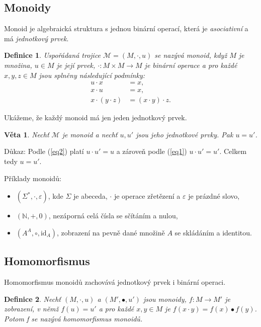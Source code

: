 \documentclass[a4paper,11pt,twocolumn]{article}
\newtheorem{definice}{Definice}
\newtheorem{veta}{Věta}
\begin{document}
\subsection{Monoidy}
Monoid je algebraická struktura s jednou binární operací, která je \textit{asociativní} a má \textit{jednotkový prvek}.

\begin{definice}\label{def1}
\textit{Us\-pořádaná trojice $\mathcal{M} = (M, \cdot, u)$ se nazývá \emph{monoid}, když $M$ je množina, $u \in M$ je její prvek, $\cdot : M \times M \to M$ je binární operace a pro každé $x, y, z \in M$ jsou splněny následující podmínky:
\begin{align}
u \cdot x &= x, \label{eq1} \\
x \cdot u &= x, \label{eq2} \\
x \cdot (y \cdot z) &= (x \cdot y) \cdot z. \label{eq3}
\end{align}} 
\end{definice}

\noindent Ukážeme, že každý monoid má jen jeden jednotkový prvek.

\begin{veta}\label{veta1}
\textit{Nechť $\mathcal{M}$ je monoid a nechť $u, u'$ jsou jeho jednotkové prvky. Pak $u = u'$.}
\end{veta}

Důkaz: Podle (\ref{eq2}) platí $u \cdot u' = u$ a zároveň podle (\ref{eq1}) $u \cdot u' = u'$. Celkem tedy $u = u'$.

Příklady monoidů: 
\begin{itemize}
  \item $(\Sigma^\ast, \cdot, \varepsilon)$, kde $\Sigma$ je abeceda, $\cdot$ je operace zřetězení a $\varepsilon$ je prázdné slovo,
  \item $(\mathbb{N}, +, 0)$, nezáporná celá čísla se sčítáním a nulou,
  \item $(A^A, \circ, \mathrm{id}_A)$, zobrazení na pevně dané množině $A$ se skládáním a identitou.
\end{itemize}

\subsection{Homomorfismus}
Homomorfismus monoidů zachovává jednotkový prvek i binární operaci.

\begin{definice}\label{def2}
\textit{Nechť $(M, \cdot, u)$ a $(M', \bullet, u')$ jsou monoidy, $f : M \to M'$ je zobrazení, v němž $f(u) = u'$ a pro každé $x, y \in M$ je $f(x \cdot y) = f(x) \bullet f(y)$. Potom f se nazývá \emph{homomorfismus} monoidů.}
\end{definice}
\end{document}
